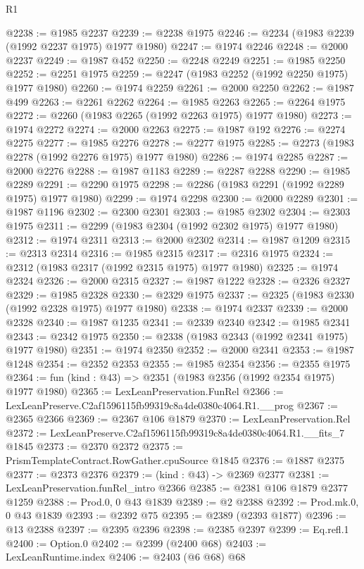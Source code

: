\begin{lexlean}{R1}
\begin{coremodule}
@2238 := @1985 @2237
@2239 := @2238 @1975
@2246 := @2234 (@1983 @2239 (@1992 @2237 @1975) @1977 @1980)
@2247 := @1974 @2246
@2248 := @2000 @2237
@2249 := @1987 @452
@2250 := @2248 @2249
@2251 := @1985 @2250
@2252 := @2251 @1975
@2259 := @2247 (@1983 @2252 (@1992 @2250 @1975) @1977 @1980)
@2260 := @1974 @2259
@2261 := @2000 @2250
@2262 := @1987 @499
@2263 := @2261 @2262
@2264 := @1985 @2263
@2265 := @2264 @1975
@2272 := @2260 (@1983 @2265 (@1992 @2263 @1975) @1977 @1980)
@2273 := @1974 @2272
@2274 := @2000 @2263
@2275 := @1987 @192
@2276 := @2274 @2275
@2277 := @1985 @2276
@2278 := @2277 @1975
@2285 := @2273 (@1983 @2278 (@1992 @2276 @1975) @1977 @1980)
@2286 := @1974 @2285
@2287 := @2000 @2276
@2288 := @1987 @1183
@2289 := @2287 @2288
@2290 := @1985 @2289
@2291 := @2290 @1975
@2298 := @2286 (@1983 @2291 (@1992 @2289 @1975) @1977 @1980)
@2299 := @1974 @2298
@2300 := @2000 @2289
@2301 := @1987 @1196
@2302 := @2300 @2301
@2303 := @1985 @2302
@2304 := @2303 @1975
@2311 := @2299 (@1983 @2304 (@1992 @2302 @1975) @1977 @1980)
@2312 := @1974 @2311
@2313 := @2000 @2302
@2314 := @1987 @1209
@2315 := @2313 @2314
@2316 := @1985 @2315
@2317 := @2316 @1975
@2324 := @2312 (@1983 @2317 (@1992 @2315 @1975) @1977 @1980)
@2325 := @1974 @2324
@2326 := @2000 @2315
@2327 := @1987 @1222
@2328 := @2326 @2327
@2329 := @1985 @2328
@2330 := @2329 @1975
@2337 := @2325 (@1983 @2330 (@1992 @2328 @1975) @1977 @1980)
@2338 := @1974 @2337
@2339 := @2000 @2328
@2340 := @1987 @1235
@2341 := @2339 @2340
@2342 := @1985 @2341
@2343 := @2342 @1975
@2350 := @2338 (@1983 @2343 (@1992 @2341 @1975) @1977 @1980)
@2351 := @1974 @2350
@2352 := @2000 @2341
@2353 := @1987 @1248
@2354 := @2352 @2353
@2355 := @1985 @2354
@2356 := @2355 @1975
@2364 := fun (kind : @43) => @2351 (@1983 @2356 (@1992 @2354 @1975) @1977 @1980)
@2365 := LexLeanPreservation.FunRel
@2366 := LexLeanPreserve.C2af1596115fb99319c8a4de0380c4064.R1.__prog
@2367 := @2365 @2366
@2369 := @2367 @106 @1879
@2370 := LexLeanPreservation.Rel
@2372 := LexLeanPreserve.C2af1596115fb99319c8a4de0380c4064.R1.__fits_7 @1845
@2373 := @2370 @2372
@2375 := PrismTemplateContract.RowGather.cpuSource @1845
@2376 := @1887 @2375
@2377 := @2373 @2376
@2379 := (kind : @43) -> @2369 @2377
@2381 := LexLeanPreservation.funRel_intro @2366
@2385 := @2381 @106 @1879 @2377 @1259
@2388 := Prod.{0, 0} @43 @1839
@2389 := @2 @2388
@2392 := Prod.mk.{0, 0} @43 @1839
@2393 := @2392 @75
@2395 := @2389 (@2393 @1877)
@2396 := @13 @2388
@2397 := @2395 @2396
@2398 := @2385 @2397
@2399 := Eq.refl.{1}
@2400 := Option.{0}
@2402 := @2399 (@2400 @68)
@2403 := LexLeanRuntime.index
@2406 := @2403 (@6 @68) @68

\end{coremodule}
\end{lexlean}
